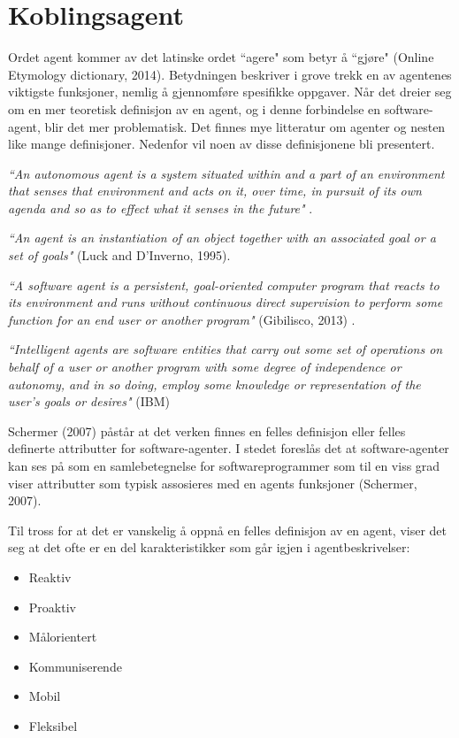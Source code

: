 \section{Koblingsagent}
Ordet agent kommer av det latinske ordet ``agere" som betyr å ``gjøre" (Online Etymology dictionary, 2014)\cite{website:agent}. Betydningen beskriver i grove trekk en av agentenes viktigste funksjoner, nemlig å gjennomføre spesifikke oppgaver. Når det dreier seg om en mer teoretisk definisjon av en agent, og i denne forbindelse en software-agent, blir det mer problematisk. Det finnes mye litteratur om agenter og nesten like mange definisjoner. Nedenfor vil noen av disse definisjonene bli presentert.

\textit{``An autonomous agent is a system situated within and a part of an environment
that senses that environment and acts on it, over time, in pursuit of its own agenda
and so as to effect what it senses in the future"} \cite{agent}.

\textit{``An agent is an instantiation of an object together with an associated goal or a set of goals"} (Luck and D'Inverno, 1995)\cite{luck_dinverno_agent}.

\textit{``A software agent is a persistent, goal-oriented computer program that reacts to its environment and runs without continuous direct supervision to perform some function for an end user or another program"} (Gibilisco, 2013) \cite{gibilesco_agent}.

\textit{``Intelligent agents are software entities that carry out some set of operations on behalf of a user or another program with some degree of independence or autonomy, and in so doing,
employ some knowledge or representation of the user's goals or desires"} (IBM)

Schermer (2007)\cite{schermer} påstår at det verken finnes en felles definisjon eller felles definerte attributter for software-agenter. I stedet foreslås det at software-agenter kan ses på som en samlebetegnelse for softwareprogrammer som til en viss grad viser attributter som typisk assosieres med en agents funksjoner (Schermer, 2007)\cite{schermer}.

Til tross for at det er vanskelig å oppnå en felles definisjon av en agent, viser det seg at det ofte er en del karakteristikker som går igjen i agentbeskrivelser:
\begin{itemize}
\item Reaktiv
\item Proaktiv
\item Målorientert
\item Kommuniserende
\item Mobil
\item Fleksibel
\end{itemize}

